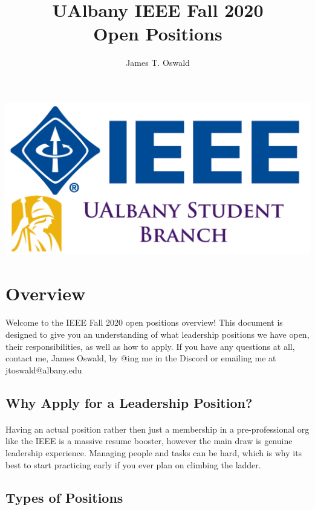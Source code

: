 \documentclass{article}
\author{James T. Oswald}
\title{UAlbany IEEE Fall 2020 \\ Open Positions}
\begin{document}
\maketitle
\thispagestyle{fancy}
\centering
\includegraphics[scale=0.2]{Logo.png}
\tableofcontents
\newpage
\raggedright

\section{Overview}
\paragraph{}
Welcome to the IEEE Fall 2020 open positions overview! This document is designed to give you an understanding of what leadership positions we have open, their responsibilities, as well as how to apply. If you have any questions at all, contact me, James Oswald, by @ing me in the Discord or emailing me at jtoswald@albany.edu 

\subsection{Why Apply for a Leadership Position?}
\paragraph{}
Having an actual position rather then just a membership in a pre-professional org like the IEEE is a massive resume booster, however the main draw is genuine leadership experience. Managing people and tasks can be hard, which is why its best to start practicing early if you ever plan on climbing the ladder. 

\subsection{Types of Positions}
\end{document}
